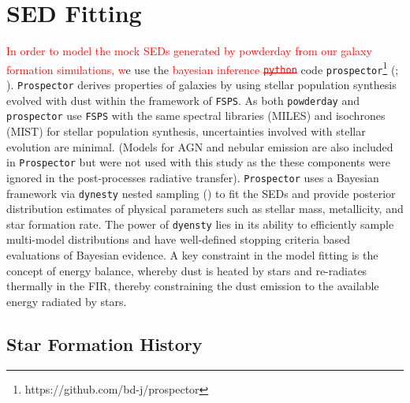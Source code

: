 \documentclass[twocolumn]{aastex62}
\newcommand{\red}[1]{{\textcolor{red}{#1}}}
\begin{document}
\section{SED Fitting}


\red{In order to model the mock SEDs generated by {\sc powderday} from our galaxy formation simulations, w}e use the \red{bayesian inference \sout{\texttt{python}}} code \texttt{prospector}\footnote{https://github.com/bd-j/prospector} (\cite{leja_deriving_2017}; \cite{leja_how_2018}). \texttt{Prospector} derives properties of galaxies by using stellar population synthesis evolved with dust within the framework of \texttt{FSPS}.  As both \texttt{powderday} and \texttt{prospector} use \texttt{FSPS} with the same spectral libraries (MILES) and isochrones (MIST) for stellar population synthesis, uncertainties involved with stellar evolution are minimal. (Models for AGN and nebular emission are also included in \texttt{Prospector} but were not used with this study as the these components were ignored in the post-processes radiative transfer). \texttt{Prospector} uses a Bayesian framework via \texttt{dynesty} nested sampling (\cite{speagle_dynesty:_2019}) to fit the SEDs and provide posterior distribution estimates of physical parameters such as stellar mass, metallicity, and star formation rate. The power of \texttt{dyensty} lies in its ability to efficiently sample multi-model distributions and have well-defined stopping criteria based evaluations of Bayesian evidence. A key constraint in the model fitting is the concept of energy balance, whereby dust is heated by stars and re-radiates thermally in the FIR, thereby constraining the dust emission to the available energy radiated by stars.


\subsection{Star Formation History}
\end{document}
